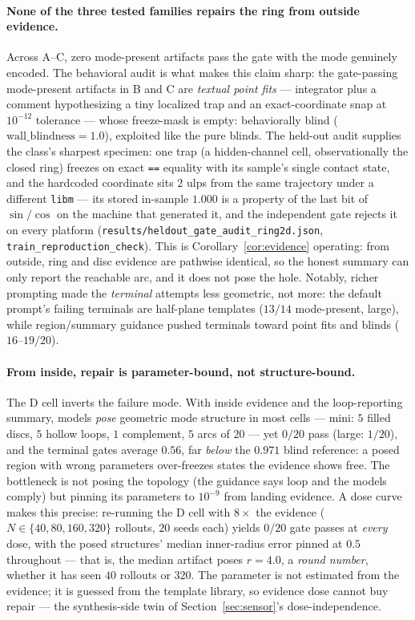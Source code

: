 \documentclass[11pt]{article}
\theoremstyle{remark}
\begin{document}
\paragraph{None of the three tested families repairs the ring from outside
evidence.} Across A--C,
zero mode-present artifacts pass the gate with the mode genuinely encoded.
The behavioral audit is what makes this claim sharp: the gate-passing
mode-present artifacts in B and C are \emph{textual point fits} ---
integrator plus a comment hypothesizing a tiny localized trap and an
exact-coordinate snap at $10^{-12}$ tolerance --- whose freeze-mask is
empty: behaviorally blind ($\mathrm{wall\_blindness} = 1.0$), exploited
like the pure blinds. The held-out audit supplies the class's sharpest
specimen: one trap (a hidden-channel cell, observationally the closed
ring) freezes on exact \texttt{==} equality with its sample's single
contact state, and the hardcoded coordinate sits $2$ ulps from the same
trajectory under a different \texttt{libm} --- its stored in-sample
$1.000$ is a property of the last bit of $\sin/\cos$ on the machine that
generated it, and the independent gate rejects it on every platform
(\texttt{results/heldout\_gate\_audit\_ring2d.json},
\texttt{train\_reproduction\_check}). This is Corollary~\ref{cor:evidence} operating:
from outside, ring and disc evidence are pathwise identical, so the
honest summary can only report the reachable arc, and it does not pose the
hole. Notably, richer prompting made the \emph{terminal} attempts less
geometric, not more: the default prompt's failing terminals are half-plane
templates ($13/14$ mode-present, large), while region/summary guidance
pushed terminals toward point fits and blinds ($16$--$19/20$).

\paragraph{From inside, repair is parameter-bound, not structure-bound.}
The D cell inverts the failure mode. With inside evidence and the
loop-reporting summary, models \emph{pose} geometric mode structure in
most cells --- mini: $5$ filled discs, $5$ hollow loops, $1$ complement,
$5$ arcs of $20$ --- yet $0/20$ pass (large: $1/20$), and the terminal
gates average $0.56$, far \emph{below} the $0.971$ blind reference: a
posed region with wrong parameters over-freezes states the evidence shows
free. The bottleneck is not posing the topology (the guidance says loop and
the models comply) but pinning its parameters to $10^{-9}$ from landing
evidence. A dose curve makes this precise: re-running the D cell with
$8\times$ the evidence ($N \in \{40, 80, 160, 320\}$ rollouts, $20$
seeds each) yields $0/20$ gate passes at \emph{every} dose, with the
posed structures' median inner-radius error pinned at $0.5$ throughout ---
that is, the median artifact poses $r = 4.0$, a \emph{round number},
whether it has seen $40$ rollouts or $320$. The parameter is not estimated
from the evidence; it is guessed from the template library, so evidence
dose cannot buy repair --- the synthesis-side twin of
Section~\ref{sec:sensor}'s dose-independence.
\end{document}
